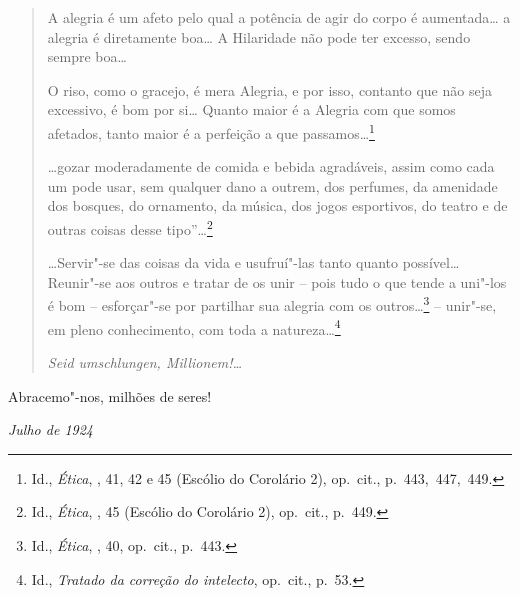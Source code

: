 \begin{quote}
A alegria é um afeto pelo qual a potência de agir do corpo é
aumentada\ldots{} a alegria é diretamente boa\ldots{} A Hilaridade não pode ter
excesso, sendo sempre boa\ldots{} \linebreak

\quebra

\noindent{}O riso, como o gracejo, é mera Alegria, e
por isso, contanto que não seja excessivo, é bom por si\ldots{} Quanto maior
é a Alegria com que somos afetados, tanto maior é a perfeição a que
passamos\ldots{}\footnote{Id., \emph{Ética}, , 41, 42 e 45 (Escólio do
  Corolário 2), op.~cit., p.~443,~447,~449.}

\ldots{}gozar moderadamente de comida e bebida agradáveis, assim como cada
um pode usar, sem qualquer dano a outrem, dos perfumes, da amenidade dos
bosques, do ornamento, da música, dos jogos esportivos, do teatro e de
outras coisas desse tipo''\ldots{}\footnote{Id., \emph{Ética}, , 45
  (Escólio do Corolário 2), op.~cit., p.~449.}

\ldots{}Servir"-se das coisas da vida e usufruí"-las tanto quanto possível\ldots{}
Reunir"-se aos outros e tratar de os unir -- pois tudo o que tende a
uni"-los é bom -- esforçar"-se por partilhar sua alegria com os outros\ldots{}\footnote{Id.,
  \emph{Ética}, , 40, op.~cit., p.~443.}
-- unir"-se, em pleno conhecimento, com toda a natureza\ldots{}\footnote{Id.,
  \emph{Tratado da correção do intelecto}, op.~cit., p.~53.}

\emph{Seid umschlungen, Millionem!\ldots{}}
\end{quote}

Abracemo"-nos, milhões de seres!

\begin{flushright}
\emph{Julho de 1924}
\end{flushright}
